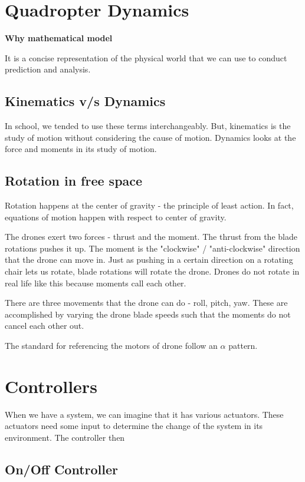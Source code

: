 \chapter{Quadropter Dynamics}

\textbf{Why mathematical model}

It is a concise representation of the physical world that we can use to conduct prediction and analysis. 

\section{Kinematics v/s Dynamics}

In school, we tended to use these terms interchangeably. But, kinematics is the study of motion without considering the cause of motion. Dynamics looks at the force and moments in its study of motion.

\section{Rotation in free space}

Rotation happens at the center of gravity - the principle of least action. In fact, equations of motion happen with respect to center of gravity.

The drones exert two forces - thrust and the moment. The thrust from the blade rotations pushes it up. The moment is the "clockwise" / "anti-clockwise" direction that the drone can move in. Just as pushing in a certain direction on a rotating chair lets us rotate, blade rotations will rotate the drone. Drones do not rotate in real life like this because moments call each other.

There are three movements that the drone can do - roll, pitch, yaw. These are accomplished by varying the drone blade speeds such that the moments do not cancel each other out.

The standard for referencing the motors of drone follow an $\alpha$ pattern.

\chapter{Controllers}

When we have a system, we can imagine that it has various actuators. These actuators need some input to determine the change of the system in its environment. The controller then 

\section{On/Off Controller}

